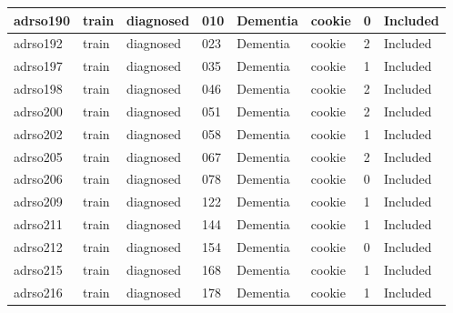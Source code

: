 \begin{center}
\begin{longtable}{|l|l|l|l|l|l|l|l|}
adrso190       & train                 & diagnosed         & 010                & Dementia             & cookie          & 0                & Included      \\ \hline
adrso192       & train                 & diagnosed         & 023                & Dementia             & cookie          & 2                & Included      \\ \hline
adrso197       & train                 & diagnosed         & 035                & Dementia             & cookie          & 1                & Included      \\ \hline
adrso198       & train                 & diagnosed         & 046                & Dementia             & cookie          & 2                & Included      \\ \hline
adrso200       & train                 & diagnosed         & 051                & Dementia             & cookie          & 2                & Included      \\ \hline
adrso202       & train                 & diagnosed         & 058                & Dementia             & cookie          & 1                & Included      \\ \hline
adrso205       & train                 & diagnosed         & 067                & Dementia             & cookie          & 2                & Included      \\ \hline
adrso206       & train                 & diagnosed         & 078                & Dementia             & cookie          & 0                & Included      \\ \hline
adrso209       & train                 & diagnosed         & 122                & Dementia             & cookie          & 1                & Included      \\ \hline
adrso211       & train                 & diagnosed         & 144                & Dementia             & cookie          & 1                & Included      \\ \hline
adrso212       & train                 & diagnosed         & 154                & Dementia             & cookie          & 0                & Included      \\ \hline
adrso215       & train                 & diagnosed         & 168                & Dementia             & cookie          & 1                & Included      \\ \hline
adrso216       & train                 & diagnosed         & 178                & Dementia             & cookie          & 1                & Included      \\ \hline

\end{longtable}
\end{center}
